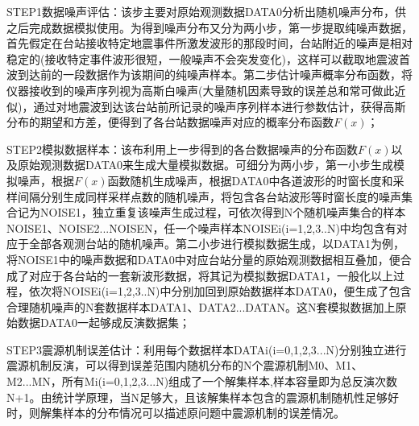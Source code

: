 STEP1数据噪声评估：该步主要对原始观测数据DATA0分析出随机噪声分布，供之后完成数据模拟使用。为得到噪声分布又分为两小步，第一步提取纯噪声数据，首先假定在台站接收特定地震事件所激发波形的那段时间，台站附近的噪声是相对稳定的(接收特定事件波形很短，一般噪声不会突发变化)，这样可以截取地震波首波到达前的一段数据作为该期间的纯噪声样本。第二步估计噪声概率分布函数，将仪器接收到的噪声序列视为高斯白噪声(大量随机因素导致的误差总和常可做此近似)，通过对地震波到达该台站前所记录的噪声序列样本进行参数估计，获得高斯分布的期望和方差，便得到了各台站数据噪声对应的概率分布函数$F(x)$；

STEP2模拟数据样本：该布利用上一步得到的各台数据噪声的分布函数$F(x)$以及原始观测数据DATA0来生成大量模拟数据。可细分为两小步，第一小步生成模拟噪声，根据$F(x)$函数随机生成噪声，根据DATA0中各道波形的时窗长度和采样间隔分别生成同样采样点数的随机噪声，将包含各台站波形等时窗长度的噪声集合记为NOISE1，独立重复该噪声生成过程，可依次得到N个随机噪声集合的样本NOISE1、NOISE2...NOISEN，任一个噪声样本NOISEi(i=1,2,3..N)中均包含有对应于全部各观测台站的随机噪声。第二小步进行模拟数据生成，以DATA1为例，将NOISE1中的噪声数据和DATA0中对应台站分量的原始观测数据相互叠加，便合成了对应于各台站的一套新波形数据，将其记为模拟数据DATA1，一般化以上过程，依次将NOISEi(i=1,2,3..N)中分别加回到原始数据样本DATA0，便生成了包含合理随机噪声的N套数据样本DATA1、DATA2...DATAN。这N套模拟数据加上原始数据DATA0一起够成反演数据集；

STEP3震源机制误差估计：利用每个数据样本DATAi(i=0,1,2,3...N)分别独立进行震源机制反演，可以得到误差范围内随机分布的N个震源机制M0、M1、M2...MN，所有Mi(i=0,1,2,3...N)组成了一个解集样本,样本容量即为总反演次数N+1。由统计学原理，当N足够大，且该解集样本包含的震源机制随机性足够好时，则解集样本的分布情况可以描述原问题中震源机制的误差情况。
